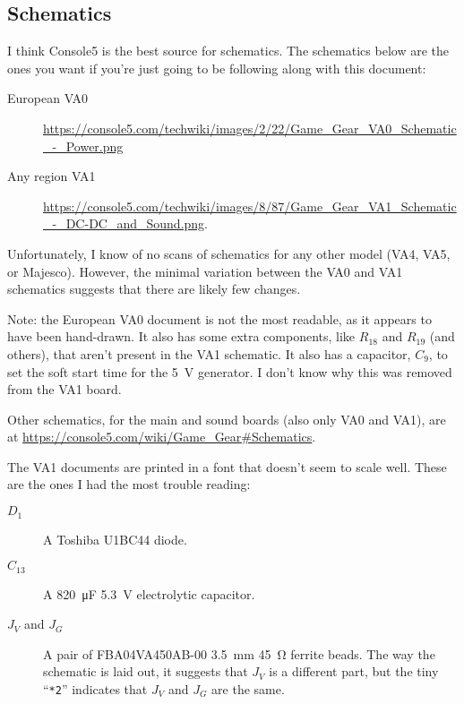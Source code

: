 \documentclass{article}
\newcommand{\model}{\textsf}
\begin{document}
\subsection{Schematics}
\label{sec:documents_schematics}
I think Console5 is the best source for schematics. The schematics
below are the ones you want if you're just going to be following along
with this document:
\begin{description}
\item[European \model{VA0}]
  \url{https://console5.com/techwiki/images/2/22/Game_Gear_VA0_Schematic_-_Power.png}
\item[Any region \model{VA1}]
  \url{https://console5.com/techwiki/images/8/87/Game_Gear_VA1_Schematic_-_DC-DC_and_Sound.png}.
\end{description}

Unfortunately, I know of no scans of schematics for any other model
(\model{VA4}, \model{VA5}, or Majesco). However, the minimal variation
between the \model{VA0} and \model{VA1} schematics suggests that there
are likely few changes.

Note: the European \model{VA0} document is not the most readable, as
it appears to have been hand-drawn. It also has some extra components,
like $R_{18}$ and $R_{19}$ (and others), that aren't present in the
\model{VA1} schematic. It also has a capacitor, $C_9$, to set the soft
start time for the \qty{5}{\volt} generator. I don't know why this was
removed from the \model{VA1} board.

Other schematics, for the main and sound boards (also only \model{VA0}
and \model{VA1}), are at
\url{https://console5.com/wiki/Game_Gear#Schematics}.

The \model{VA1} documents are printed in a font that doesn't seem to
scale well. These are the ones I had the most trouble reading:

\begin{description}
\item[$D_1$] A Toshiba \model{U1BC44} diode.
\item[$C_{13}$] A \qty{820}{\micro\farad} \qty{5.3}{\volt}
  electrolytic capacitor.
  
\item[$J_V$ and $J_G$] A pair of \model{FBA04VA450AB-00}
  \qty{3.5}{\milli\meter} \qty{45}{\ohm} ferrite beads. The way the
  schematic is laid out, it suggests that $J_V$ is a different part,
  but the tiny ``\texttt{*2}'' indicates that $J_V$ and $J_G$ are the
  same.
\end{description}
\end{document}
